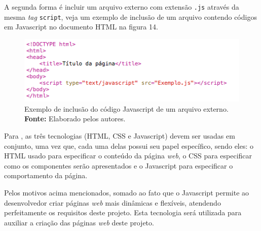 A segunda forma é incluir um arquivo externo com extensão \texttt{.js} através da mesma \textit{tag} \texttt{script}, veja um exemplo de inclusão de um arquivo contendo códigos em Javascript no documento HTML na figura 14.

\begin{figure}[h!]
	\centerline{\includegraphics[scale=0.8]{./imagens/javascript_include.png}}
	\caption[Exemplo de inclusão do código Javascript de um arquivo externo]
	{Exemplo de inclusão do código Javascript de um arquivo externo. \textbf{Fonte:} Elaborado pelos autores.}
	\label{fig:exemplo1}
\end{figure}

Para , as três tecnologias (HTML, CSS e Javascript) devem ser usadas em conjunto, uma vez que, cada uma delas possui seu papel específico, sendo eles: o HTML usado para especificar o conteúdo da página \textit{web}, o CSS para especificar como os componentes serão apresentados e o Javascript para especificar o comportamento da página.

Pelos motivos acima mencionados, somado ao fato que o Javascript permite ao desenvolvedor criar páginas \textit{web} mais dinâmicas e flexíveis, atendendo perfeitamente os requisitos deste projeto. Esta tecnologia será utilizada para auxiliar a criação das páginas \textit{web} deste projeto.